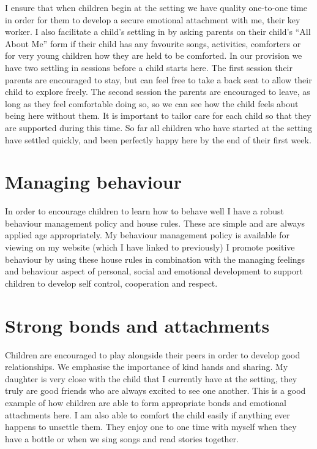 \documentclass[10pt,a4paper]{report}
\begin{document}
I ensure that when children begin at the setting we have quality one-to-one time in order for them to develop a secure emotional attachment with me, their key worker. I also facilitate a child's settling in by asking parents on their child's “All About Me” form if their child has any favourite songs, activities, comforters or for very young children how they are held to be comforted. In our provision we have two settling in sessions before a child starts here. The first session their parents are encouraged to stay, but can feel free to take a back seat to allow their child to explore freely. The second session the parents are encouraged to leave, as long as they feel comfortable doing so, so we can see how the child feels about being here without them. It is important to tailor care for each child so that they are supported during this time. So far all children who have started at the setting have settled quickly, and been perfectly happy here by the end of their first week.

\section{Managing behaviour}

In order to encourage children to learn how to behave well I have a robust behaviour management policy and house rules. These are simple and are always applied age appropriately. My behaviour management policy is available for viewing on my website (which I have linked to previously) I promote positive behaviour by using these house rules in combination with the managing feelings and behaviour aspect of personal, social and emotional development to support children to develop self control, cooperation and respect.

\section{Strong bonds and attachments}

Children are encouraged to play alongside their peers in order to develop good relationships. We emphasise the importance of kind hands and sharing. My daughter is very close with the child that I currently have at the setting, they truly are good friends who are always excited to see one another. This is a good example of how children are able to form appropriate bonds and emotional attachments here. I am also able to comfort the child easily if anything ever happens to unsettle them. They enjoy one to one time with myself when they have a bottle or when we sing songs and read stories together. 
\end{document}
